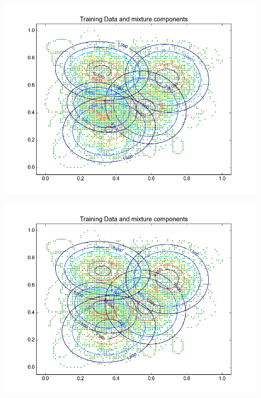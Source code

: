 \documentclass[11pt,a4paper]{article}
\begin{document}
\begin{minipage}[b]{0.25\textwidth}
\begin{figure}[H]
  \centering
  \includegraphics[width=.8\linewidth]{Figures/contours_bA.test10.png}

  \label{fig:sfig1}
\end{figure}%
\end{minipage}
\begin{minipage}[b]{0.25\textwidth}
\begin{figure}[H]
  \centering
  \includegraphics[width=.8\linewidth]{Figures/contours_bA.test15.png}

  \label{fig:sfig1}
\end{figure}%
\end{minipage}
\end{document}
